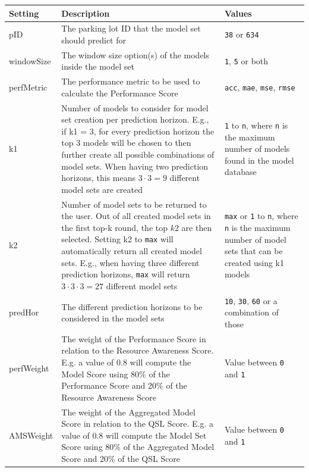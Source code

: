 \begin{table}[htbp]
  \centering
      \begin{tabular}{  l  p{7cm}  p{3cm} }
          \toprule
  \textbf{Setting}      
  & \textbf{Description}   
  & \textbf{Values} \\\midrule
  
  pID & The parking lot ID that the model set should predict for & \texttt{38} or \texttt{634} \\\hline
  windowSize & The window size option(s) of the models inside the model set & \texttt{1}, \texttt{5} or both \\\hline
  perfMetric & The performance metric to be used to calculate the Performance Score & \texttt{acc}, \texttt{mae}, \texttt{mse}, \texttt{rmse} \\\hline
  k1 & Number of models to consider for model set creation per prediction horizon. E.g., if k1 = 3, for every prediction horizon the top 3 models will be chosen to then further create all possible combinations of model sets. When having two prediction horizons, this means $3 \cdot 3 = 9$ different model sets are created & \texttt{1} to \texttt{n}, where \texttt{n} is the maximum number of models found in the model database \\\hline
  k2 & Number of model sets to be returned to the user. Out of all created model sets in the first top-k round, the top $k2$ are then selected. Setting k2 to \texttt{max} will automatically return all created model sets. E.g., when having three different prediction horizons, \texttt{max} will return $3 \cdot 3 \cdot  3 = 27$ different model sets & \texttt{max} or \texttt{1} to \texttt{n}, where \texttt{n} is the maximum number of model sets that can be created using k1 models \\\hline
  predHor & The different prediction horizons to be considered in the model sets & \texttt{10}, \texttt{30}, \texttt{60} or a combination of those \\\hline
  perfWeight & The weight of the Performance Score in relation to the Resource Awareness Score. E.g. a value of 0.8 will compute the Model Score using 80\% of the Performance Score and 20\% of the Resource Awareness Score & Value between \texttt{0} and \texttt{1} \\\hline
  AMSWeight & The weight of the Aggregated Model Score in relation to the QSL Score. E.g. a value of 0.8 will compute the Model Set Score using 80\% of the Aggregated Model Score and 20\% of the QSL Score & Value between \texttt{0} and \texttt{1} \\\hline

\end{tabular}
\end{table}

